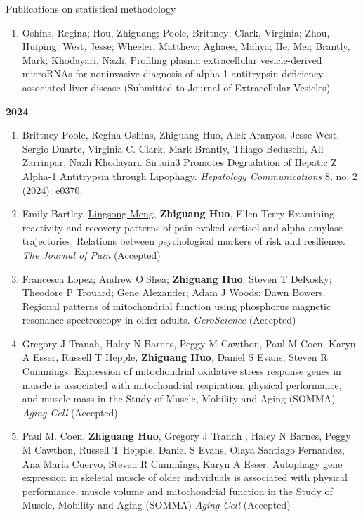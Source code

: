 \documentclass{resume} %
\begin{document}
\begin{rSection}{Publications on statistical methodology}
\begin{enumerate}[noitemsep,topsep=0pt,resume]
\item
Oshins, Regina; Hou, Zhiguang; Poole, Brittney; Clark, Virginia; Zhou, Huiping; West, Jesse; Wheeler, Matthew; Aghaee, Mahya; He, Mei; Brantly, Mark; Khodayari, Nazli,  
Profiling plasma extracellular vesicle-derived microRNAs for noninvasive diagnosis of alpha-1 antitrypsin deficiency associated liver disease
(Submitted to  Journal of Extracellular Vesicles)




\end{enumerate}

\textbf{2024}
\begin{enumerate}[noitemsep,topsep=0pt, resume]

\item 
Brittney Poole, Regina Oshins, Zhiguang Huo, Alek Aranyos, Jesse West, Sergio Duarte, Virginia C. Clark, Mark Brantly, Thiago Beduschi, Ali Zarrinpar, Nazli Khodayari.
Sirtuin3 Promotes Degradation of Hepatic Z Alpha-1 Antitrypsin through Lipophagy.
\emph{Hepatology Communications} 8, no. 2 (2024): e0370.
\label{bioinfo_42} 

\item
Emily Bartley, \underline{Lingsong Meng}, {\bf Zhiguang Huo}, Ellen Terry
Examining reactivity and recovery patterns of pain-evoked cortisol and alpha-amylase trajectories: Relations between psychological markers of risk and resilience.
\emph{The Journal of Pain} (Accepted)

\item 
Francesca Lopez; Andrew O'Shea;  {\bf Zhiguang Huo}; Steven T DeKosky; Theodore P Trouard; Gene Alexander; Adam J Woods; Dawn Bowers. 
Regional patterns of mitochondrial function using phosphorus magnetic resonance spectroscopy in older adults.
\emph{GeroScience} (Accepted)


\item 
Gregory J Tranah, Haley N Barnes, Peggy M Cawthon, Paul M Coen, Karyn A Esser, Russell T Hepple, {\bf Zhiguang Huo}, Daniel S Evans, Steven R Cummings.
Expression of mitochondrial oxidative stress response genes in muscle is associated with mitochondrial respiration, physical performance, and muscle mass in the Study of Muscle, Mobility and Aging (SOMMA)
\emph{Aging Cell} (Accepted)
\label{bioinfo_41} 

\item 
Paul M. Coen, {\bf Zhiguang Huo}, Gregory J Tranah , Haley N Barnes,  Peggy M Cawthon, Russell T Hepple, Daniel S Evans, Olaya Santiago Fernandez, Ana Maria Cuervo, Steven R Cummings, Karyn A Esser.
Autophagy gene expression in skeletal muscle of older individuals is associated with physical performance, muscle volume and mitochondrial function in the Study of Muscle, Mobility and Aging (SOMMA)
\emph{Aging Cell} (Accepted)
\label{bioinfo_40} 



\end{enumerate}
\end{rSection}
\end{document}
